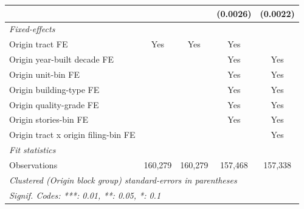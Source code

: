 \begin{tabular}{lcccc}
                                                  &                &                & (0.0026)       & (0.0022)\\   
   \midrule
   \emph{Fixed-effects}\\
   Origin tract FE                                & Yes            & Yes            & Yes            & \\  
   Origin year-built decade FE                    &                &                & Yes            & Yes\\  
   Origin unit-bin FE                             &                &                & Yes            & Yes\\  
   Origin building-type FE                        &                &                & Yes            & Yes\\  
   Origin quality-grade FE                        &                &                & Yes            & Yes\\  
   Origin stories-bin FE                          &                &                & Yes            & Yes\\  
   Origin tract x origin filing-bin FE            &                &                &                & Yes\\  
   \midrule
   \emph{Fit statistics}\\
   Observations                                   & 160,279        & 160,279        & 157,468        & 157,338\\  
   \midrule \midrule
   \multicolumn{5}{l}{\emph{Clustered (Origin block group) standard-errors in parentheses}}\\
   \multicolumn{5}{l}{\emph{Signif. Codes: ***: 0.01, **: 0.05, *: 0.1}}\\
\end{tabular}
\par\endgroup
